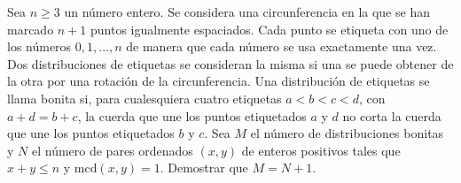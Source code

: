 Sea $n \geq 3$ un número entero. Se considera una circunferencia en la que se han marcado $n + 1$ puntos igualmente espaciados. Cada punto se etiqueta con uno de los números $0, 1, \dots, n$ de manera que cada número se usa exactamente una vez. Dos distribuciones de etiquetas se consideran la misma si una se puede obtener de la otra por una rotación de la circunferencia. Una distribución de etiquetas se llama bonita si, para cualesquiera cuatro etiquetas $a \lt b \lt c \lt d$, con $a + d = b + c$, la cuerda que une los puntos etiquetados $a$ y $d$ no corta la cuerda que une los puntos etiquetados $b$ y $c$. \newline 
Sea $M$ el número de distribuciones bonitas y $N$ el número de pares ordenados $(x,y)$ de enteros positivos tales que $x + y \leq n$ y $\text{mcd} (x, y) = 1$. Demostrar que $M=N+1$.
